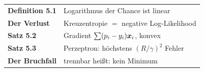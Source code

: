\begin{merksatz}
\begin{center}
\renewcommand{\arraystretch}{1.5}
\begin{tabular}{@{}P{3.0cm}P{5.6cm}@{}}
\toprule
\textbf{Definition 5.1} & Logarithmus der Chance ist linear\\
\textbf{Der Verlust} & Kreuzentropie $=$ negative Log-Likelihood\\
\textbf{Satz 5.2} & Gradient $\sum(p_i-y_i)\boldsymbol{x}_i$, konvex\\
\textbf{Satz 5.3} & Perzeptron: höchstens $(R/\gamma)^{2}$ Fehler\\
\textbf{Der Bruchfall} & trennbar heißt: kein Minimum\\
\bottomrule
\end{tabular}
\end{center}

\begin{center}
\begin{minipage}{0.88\textwidth}
\end{minipage}
\end{center}
\end{merksatz}
